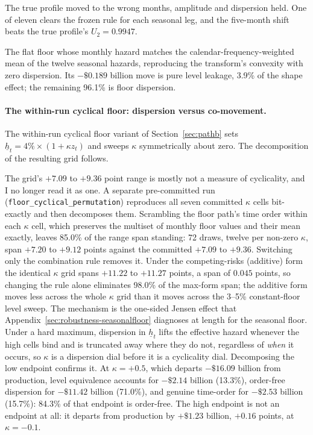 \documentclass[12pt]{article}
\begin{document}
\begin{table}[H]
\begin{threeparttable}
\begin{tablenotes}[flushleft]
\item[b] The true profile moved to the wrong months, amplitude and dispersion held. One of eleven clears the frozen rule for each seasonal leg, and the five-month shift beats the true profile's $U_2 = 0.9947$.
\item[c] The flat floor whose monthly hazard matches the calendar-frequency-weighted mean of the twelve seasonal hazards, reproducing the transform's convexity with zero dispersion. Its $-\$0.189$ billion move is pure level leakage, 3.9\% of the shape effect; the remaining 96.1\% is floor dispersion.
\end{tablenotes}
\end{threeparttable}
\end{table}

\paragraph{The within-run cyclical floor: dispersion versus co-movement.}
The within-run cyclical floor variant of Section~\ref{sec:pathb} sets $\underline{h}_t = 4\% \times (1 + \kappa z_t)$ and sweeps $\kappa$ symmetrically about zero. The decomposition of the resulting grid follows.

The grid's $+7.09$ to $+9.36$ point range is mostly not a measure of cyclicality, and I no longer read it as one. A separate pre-committed run (\texttt{floor\_cyclical\_permutation}) reproduces all seven committed $\kappa$ cells bit-exactly and then decomposes them. Scrambling the floor path's time order within each $\kappa$ cell, which preserves the multiset of monthly floor values and their mean exactly, leaves 85.0\% of the range span standing: 72 draws, twelve per non-zero $\kappa$, span $+7.20$ to $+9.12$ points against the committed $+7.09$ to $+9.36$. Switching only the combination rule removes it. Under the competing-risks (additive) form the identical $\kappa$ grid spans $+11.22$ to $+11.27$ points, a span of $0.045$ points, so changing the rule alone eliminates 98.0\% of the max-form span; the additive form moves less across the whole $\kappa$ grid than it moves across the 3--5\% constant-floor level sweep. The mechanism is the one-sided Jensen effect that Appendix~\ref{sec:robustness-seasonalfloor} diagnoses at length for the seasonal floor. Under a hard maximum, dispersion in $\underline{h}_t$ lifts the effective hazard whenever the high cells bind and is truncated away where they do not, regardless of \emph{when} it occurs, so $\kappa$ is a dispersion dial before it is a cyclicality dial. Decomposing the low endpoint confirms it. At $\kappa = +0.5$, which departs $-\$16.09$ billion from production, level equivalence accounts for $-\$2.14$ billion (13.3\%), order-free dispersion for $-\$11.42$ billion (71.0\%), and genuine time-order for $-\$2.53$ billion (15.7\%): 84.3\% of that endpoint is order-free. The high endpoint is not an endpoint at all: it departs from production by $+\$1.23$ billion, $+0.16$ points, at $\kappa = -0.1$.
\end{document}
